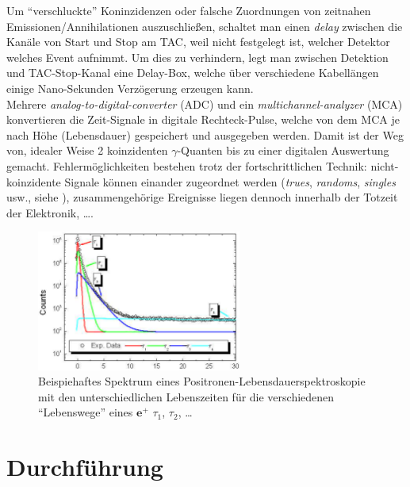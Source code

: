 \documentclass[numbers=noenddot,a4paper]{scrartcl}
\newcommand{\ix}[1]{_\text{#1}}
\newcommand{\tilt}[1]{\textit{#1}}
\begin{document}
			Um "`verschluckte"' Koninzidenzen oder falsche Zuordnungen von zeitnahen Emissionen/Annihilationen auszuschließen, schaltet man einen \tilt{delay} zwischen die Kanäle von Start und Stop am TAC, weil nicht festgelegt ist, welcher Detektor welches Event aufnimmt. Um dies zu verhindern, legt man zwischen Detektion und TAC-Stop-Kanal eine Delay-Box, welche über verschiedene Kabellängen einige Nano-Sekunden Verzögerung erzeugen kann.\\
			Mehrere \tilt{analog-to-digital-converter} (ADC) und ein \tilt{multichannel-analyzer} (MCA) konvertieren die Zeit-Signale in digitale Rechteck-Pulse, welche von dem MCA je nach Höhe (Lebensdauer) gespeichert und ausgegeben werden. Damit ist der Weg von, idealer Weise 2 koinzidenten $\gamma$-Quanten bis zu einer digitalen Auswertung gemacht. Fehlermöglichkeiten bestehen trotz der fortschrittlichen Technik: nicht-koinzidente Signale können einander zugeordnet werden (\tilt{trues}, \tilt{randoms}, \tilt{singles} usw., siehe \cite{Wiki:PET}), zusammengehörige Ereignisse liegen dennoch innerhalb der Totzeit der Elektronik, \dots . 

			\begin{figure}[h]
				\centering
				\includegraphics[width=0.6\textwidth]{beispielspektrum.png}
				\caption{Beispiehaftes Spektrum eines Positronen-Lebensdauerspektroskopie mit den unterschiedlichen Lebenszeiten für die verschiedenen "`Lebenswege"' eines $\textbf{e}^+$ $\tau\ix{1}$, $\tau\ix{2}$, \dots \cite{Augsten08}}
				\label{img:beispielspektrum}
			\end{figure}

	\newpage
	\section{Durchführung}
\end{document}
